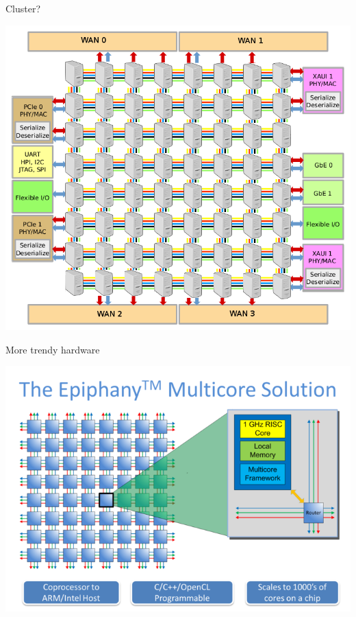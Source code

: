 \documentclass[14pt]{beamer}
\begin{document}
\begin{frame}{Cluster?}
    \begin{center}
        \includegraphics[height=0.8\textheight]{images/computer_clusterb.png}
    \end{center}
\end{frame}

\begin{frame}{More trendy hardware}
    \begin{center}
        \includegraphics[height=0.8\textheight]{images/parallella_64core.png}
    \end{center}
\end{frame}
\end{document}
